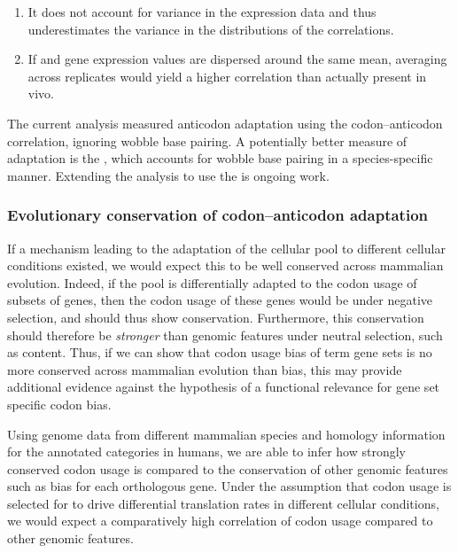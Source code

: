 \begin{enumerate}
    \item It does not account for variance in the expression data and thus
        underestimates the variance in the distributions of the correlations.
    \item If \mrna and \trna gene expression values are dispersed around the
        same mean, averaging across replicates would yield a higher correlation
        than actually present in vivo.
\end{enumerate}

The current analysis measured \trna anticodon adaptation using the
codon--anticodon correlation, ignoring wobble base pairing. A potentially better
measure of \trna adaptation is the \tai, which accounts for wobble base pairing
in a species-specific manner. Extending the analysis to use the \tai is ongoing
work.

\subsubsection{Evolutionary conservation of codon--anticodon adaptation}

If a mechanism leading to the adaptation of the cellular \trna pool to different
cellular conditions existed, we would expect this to be well conserved across
mammalian evolution. Indeed, if the \trna pool is differentially adapted to the
codon usage of subsets of genes, then the codon usage of these genes would be
under negative selection, and should thus show conservation. Furthermore, this
conservation should therefore be \emph{stronger} than genomic features under
neutral selection, such as \gc content. Thus, if we can show that codon usage
bias of \go term gene sets is no more conserved across mammalian evolution than
\gc bias, this may provide additional evidence against the hypothesis of a
functional relevance for gene set specific codon bias.

Using genome data from different mammalian species and homology information for
the annotated \go categories in humans, we are able to infer how strongly
conserved codon usage is compared to the conservation of other genomic features
such as \gc bias for each orthologous gene. Under the assumption that codon
usage is selected for to drive differential translation rates in different
cellular conditions, we would expect a comparatively high correlation of codon
usage compared to other genomic features.
